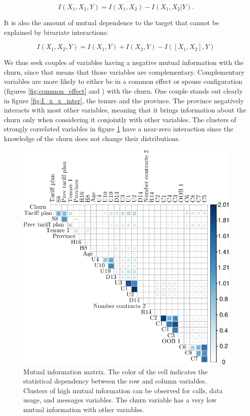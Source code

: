 \begin{equation*}
    I(X_1, X_2, Y) = I(X_1, X_2) - I(X_1, X_2 | Y).
\end{equation*}

It is also the amount of mutual dependence to the target that cannot be explained
by bivariate interactions:

\begin{equation*}
    I(X_1, X_2, Y) = I(X_1, Y) + I(X_2, Y) - I([X_1, X_2], Y)
\end{equation*}

We thus seek couples of variables having a negative mutual information with the
churn, since that means that those variables are complementary. Complementary
variables are more likely to either be in a common effect or spouse
configuration (figures \ref{fig:common_effect} and ) with the
churn. One couple stands out clearly in figure \ref{fig:I_x_x_inter}, the tenure
and the province. The province negatively interacts with most other variables,
meaning that it brings information about the churn only when considering it
conjointly with other variables. The clusters of strongly correlated variables
in figure \ref{fig:I_x_x} have a near-zero interaction since the knowledge of
the churn does not change their distributions.

\begin{figure}
    \centering
    \includegraphics[width=0.8\linewidth]{figures/I_x_x.pdf}
    \caption{Mutual information matrix. The color of the cell indicates the
    statistical dependency between the row and column variables. Clusters of
    high mutual information can be observed for calls, data usage, and messages
    variables. The churn variable has a very low mutual information with other
    variables.}
    \label{fig:I_x_x}
\end{figure}

